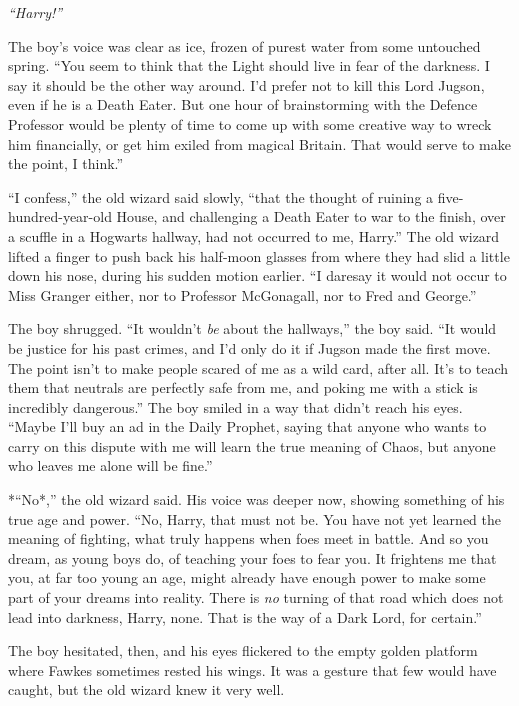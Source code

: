 \emph{``Harry!''}

The boy's voice was clear as ice, frozen of purest water from some
untouched spring. ``You seem to think that the Light should live in fear
of the darkness. I say it should be the other way around. I'd prefer not
to kill this Lord Jugson, even if he is a Death Eater. But one hour of
brainstorming with the Defence Professor would be plenty of time to come
up with some creative way to wreck him financially, or get him exiled
from magical Britain. That would serve to make the point, I think.''

``I confess,'' the old wizard said slowly, ``that the thought of ruining
a five-hundred-year-old House, and challenging a Death Eater to war to
the finish, over a scuffle in a Hogwarts hallway, had not occurred to
me, Harry.'' The old wizard lifted a finger to push back his half-moon
glasses from where they had slid a little down his nose, during his
sudden motion earlier. ``I daresay it would not occur to Miss Granger
either, nor to Professor McGonagall, nor to Fred and George.''

The boy shrugged. ``It wouldn't \emph{be} about the hallways,'' the boy
said. ``It would be justice for his past crimes, and I'd only do it if
Jugson made the first move. The point isn't to make people scared of me
as a wild card, after all. It's to teach them that neutrals are
perfectly safe from me, and poking me with a stick is incredibly
dangerous.'' The boy smiled in a way that didn't reach his eyes. ``Maybe
I'll buy an ad in the Daily Prophet, saying that anyone who wants to
carry on this dispute with me will learn the true meaning of Chaos, but
anyone who leaves me alone will be fine.''

*``No*,'' the old wizard said. His voice was deeper now, showing
something of his true age and power. ``No, Harry, that must not be. You
have not yet learned the meaning of fighting, what truly happens when
foes meet in battle. And so you dream, as young boys do, of teaching
your foes to fear you. It frightens me that you, at far too young an
age, might already have enough power to make some part of your dreams
into reality. There is \emph{no} turning of that road which does not
lead into darkness, Harry, none. That is the way of a Dark Lord, for
certain.''

The boy hesitated, then, and his eyes flickered to the empty golden
platform where Fawkes sometimes rested his wings. It was a gesture that
few would have caught, but the old wizard knew it very well.

